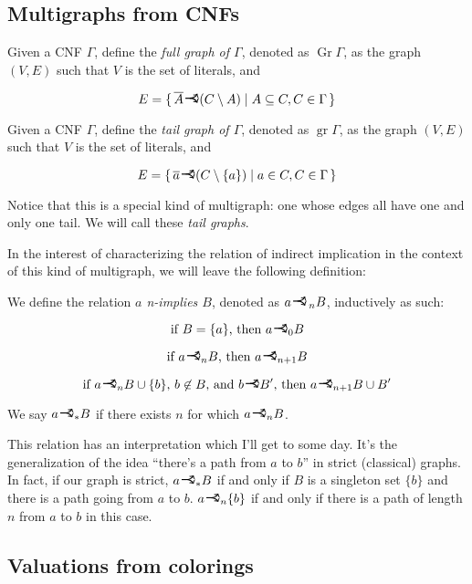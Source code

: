 \documentclass[11pt]{article}
\newcommand{\conj}[1]{\overline{#1}}
\DeclareMathOperator{\gr}{gr}
\DeclareMathOperator{\Gr}{Gr}
\newcommand{\rightcurveor}{
\!
\mathrel{
  \begin{tikzpicture}[scale=0.8]
    \draw[thick,->] (0,0) arc (90:150:-2ex);
    \draw[thick,->] (0,0) arc (90:30:2ex);
    \draw[thick] (-1ex, 0) -- (0.1ex,0);
  \end{tikzpicture}
}\!
}
\begin{document}
\subsection{Multigraphs from CNFs}

Given a CNF $\Gamma$, define the \emph{full graph of $\Gamma$}, denoted as $\Gr \Gamma$, as the graph $(V,E)$ such that $V$ is the set of literals, and

\[ E = \{ \, \conj A \rightcurveor (C \setminus A) \mid A \subseteq C, C \in \Gamma \, \}\]

Given a CNF $\Gamma$, define the \emph{tail graph of $\Gamma$}, denoted as $\gr \Gamma$, as the graph $(V,E)$ such that $V$ is the set of literals, and

\[ E = \{ \, \conj a \rightcurveor (C \setminus \{a\}) \mid a \in C, C \in \Gamma \, \}\]

Notice that this is a special kind of multigraph: one whose edges all have one and only one tail. We will call these \emph{tail graphs}.

In the interest of characterizing the relation of indirect implication in the context of this kind of multigraph, we will leave the following definition:

We define the relation \emph{$a$ n-implies $B$}, denoted as $a \rightcurveor_{\,n} B$, inductively as such:

\[\text{if } B = \{a\} \text{, then } a \rightcurveor_0 B\]

\[\text{if } a \rightcurveor_n B \text{, then } a \rightcurveor_{n+1} B\]

\[\text{if } a \rightcurveor_n B \cup \{b\} \text{, } b \not \in B \text{, and } b \rightcurveor B' \text{, then } a \rightcurveor_{n+1} B \cup B'\]

We say $a \rightcurveor_* B$ if there exists $n$ for which $a \rightcurveor_n B$.

This relation has an interpretation which I'll get to some day. It's the generalization of the idea ``there's a path from $a$ to $b$'' in strict (classical) graphs. In fact, if our graph is strict, $a \rightcurveor_* B$ if and only if $B$ is a singleton set $\{b\}$ and there is a path going from $a$ to $b$. $a \rightcurveor_n \{b\}$ if and only if there is a path of length $n$ from $a$ to $b$ in this case.

\subsection{Valuations from colorings}
\end{document}
